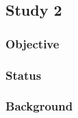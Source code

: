 


\subsection{Study 2}
\label{sec:study2}
\subsubsection{Objective}



\subsubsection{Status}


\subsubsection{Background} 



